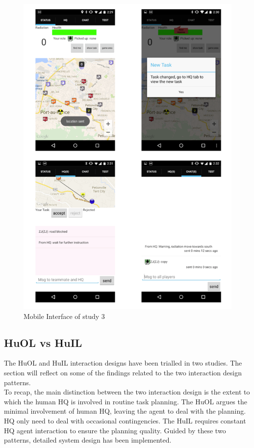 \begin{figure}[H]
  \centering
  \includegraphics[width=1\textwidth]{img/conclusion/study3interfaceMobile}
  \caption{Mobile Interface of study 3}
  \label{fig:study3interfacehq}
\end{figure}

\subsection{HuOL vs HuIL}\label{sec:conclusionHH}
The HuOL and HuIL interaction designs have been trialled in two studies. The section will reflect on some of the findings related to the two interaction design patterns. \\

To recap, the main distinction between the two interaction design is the extent to which the human HQ is involved in routine task planning. The HuOL  argues the minimal involvement of human HQ, leaving the agent to deal with the planning. HQ only need to deal with occasional contingencies. The HuIL requires constant HQ agent interaction to ensure the planning quality. Guided by these two patterns, detailed system design has been implemented.\\

